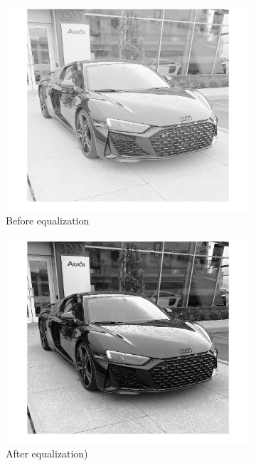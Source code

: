 \documentclass[conference]{IEEEtran}
\begin{document}
\begin{figure}[h!]
\centering
\begin{subfigure}[b]{0.4\linewidth}
\includegraphics[width=\linewidth]{images/img2.jpg}
\caption{Before equalization}
\end{subfigure}
\begin{subfigure}[b]{0.4\linewidth}
\includegraphics[width=\linewidth]{images/img17.jpg}
\caption{After equalization)}
\end{subfigure}
\begin{subfigure}[b]{0.4\linewidth}

\end{subfigure}
\end{figure}
\end{document}
